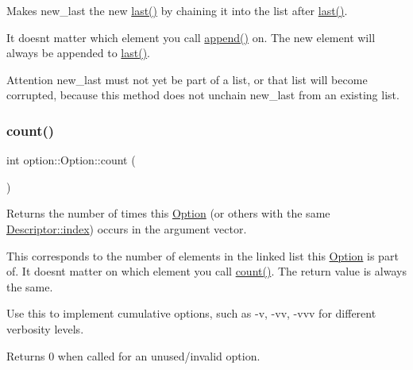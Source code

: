 Makes {\ttfamily new\+\_\+last} the new \hyperlink{classoption_1_1Option_afe2aff68191e55b59c53fac3dbbcd7c3}{last()} by chaining it into the list after \hyperlink{classoption_1_1Option_afe2aff68191e55b59c53fac3dbbcd7c3}{last()}. 

It doesn\textquotesingle{}t matter which element you call \hyperlink{classoption_1_1Option_a59030822a1ec4e667e6c288d7e5ec961}{append()} on. The new element will always be appended to \hyperlink{classoption_1_1Option_afe2aff68191e55b59c53fac3dbbcd7c3}{last()}.

\begin{DoxyAttention}{Attention}
{\ttfamily new\+\_\+last} must not yet be part of a list, or that list will become corrupted, because this method does not unchain {\ttfamily new\+\_\+last} from an existing list. 
\end{DoxyAttention}
\mbox{\label{classoption_1_1Option_a8a632dcd89af60fe0806deb756c08f14}} 
\subsubsection{\texorpdfstring{count()}{count()}}
{\footnotesize\ttfamily int option\+::\+Option\+::count (\begin{DoxyParamCaption}{ }\end{DoxyParamCaption})\hspace{0.3cm}{\ttfamily [inline]}}



Returns the number of times this \hyperlink{classoption_1_1Option}{Option} (or others with the same \hyperlink{structoption_1_1Descriptor_a1fee8ac44f529c99ac2b1149b4c391b1}{Descriptor\+::index}) occurs in the argument vector. 

This corresponds to the number of elements in the linked list this \hyperlink{classoption_1_1Option}{Option} is part of. It doesn\textquotesingle{}t matter on which element you call \hyperlink{classoption_1_1Option_a8a632dcd89af60fe0806deb756c08f14}{count()}. The return value is always the same.

Use this to implement cumulative options, such as -\/v, -\/vv, -\/vvv for different verbosity levels.

Returns 0 when called for an unused/invalid option. \mbox{\label{classoption_1_1Option_abb4e13cd7c90999c8a6b1f871cece283}} 
